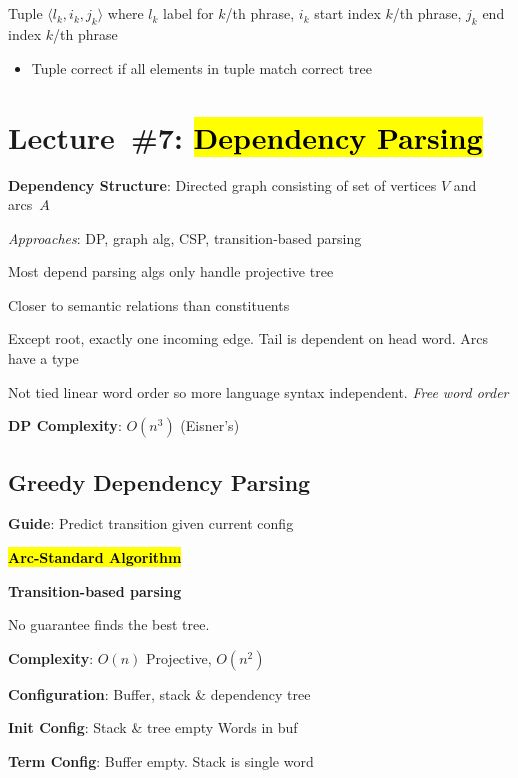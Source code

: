 \documentclass[8pt]{extarticle}
\renewcommand{\green}[1]{{\color{ForestGreen} #1}}
\newcommand{\greenbf}[1]{\textbf{\green{#1}}}
\begin{document}
\begin{multicols}{3}
  \subsection*{}

  Tuple ${\langle l_k, i_k, j_k  \rangle}$ where $l_k$ label for $k$\-/th phrase, $i_k$ start index $k$\-/th phrase, $j_k$ end index $k$\-/th phrase
  \begin{itemize}
    \item Tuple correct if all elements in tuple match correct tree
  \end{itemize}

  \section*{Lecture~\#7: \hl{Dependency Parsing}}

  \greenbf{Dependency Structure}: Directed graph consisting of set of vertices $V$ and arcs~$A$

  \textit{Approaches}: DP, graph alg, CSP, transition-based parsing

  Most depend parsing algs only handle projective tree

  Closer to semantic relations than constituents

  Except root, exactly one incoming edge. Tail is dependent on head word. Arcs have a type

  Not tied linear word order so more language syntax independent. \textit{Free word order}

  \textbf{DP Complexity}: $O(n^3)$ (Eisner's)

  \subsection*{Greedy Dependency Parsing}

  \greenbf{Guide}: Predict transition given current config

  \greenbf{\hl{Arc-Standard Algorithm}}

  \textbf{Transition-based parsing}

  No guarantee finds the best tree.

  \textbf{Complexity}: $O(n)$ Projective, $O(n^2)$

  \textbf{Configuration}: Buffer, stack \& dependency tree

  \textbf{Init Config}: Stack \& tree empty Words in buf

  \textbf{Term Config}: Buffer empty. Stack is single word


\end{multicols}
\end{document}
